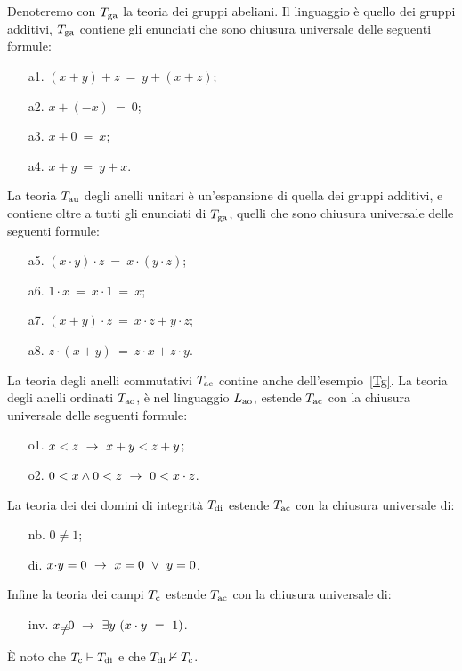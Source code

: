 \begin{example}
Denoteremo con $T_{\rm ga}$ la teoria dei gruppi abeliani. Il linguaggio \`e quello dei gruppi additivi, $T_{\rm ga}$ contiene gli enunciati che sono chiusura universale delle seguenti formule:
\begin{itemize}
\item[a1.] $(x+y) +z\ =\ y+(x+z)$;
\item[a2.] $x+(-x)\ =\ 0$;
\item[a3.] $x+0\ = \ x$;
\item[a4.] $x+y\ =\ y+x$.
\end{itemize}
La teoria $T_{\rm au}$ degli anelli unitari \`e un'espansione di quella dei gruppi additivi, e contiene oltre a tutti gli enunciati di $T_{\rm ga}$, quelli che sono chiusura universale delle seguenti formule:
\begin{itemize}
\item[a5.] $(x\cdot  y)\cdot  z\  =\ x\cdot (y\cdot  z)$;
\item[a6.] $1\cdot  x\ =\ x\cdot  1\ =\ x$;
\item[a7.] $(x+y)\cdot  z\ =\ x\cdot  z + y\cdot  z$;
\item[a8.] $z\cdot  (x+y)\ =\ z\cdot  x + z\cdot  y$.
\end{itemize}
La teoria degli anelli commutativi $T_{\rm ac}$ contine anche  dell'esempio~\ref{Tg}. La teoria degli anelli ordinati $T_{\rm ao}$, \`e nel linguaggio $L_{\rm ao}$, estende $T_{\rm ac}$ con la chiusura universale delle seguenti formule:
\begin{itemize}
\item[o1.] $x<z\ \rightarrow\ x+y<z+y$;
\item[o2.] $0<x \wedge 0<z\ \rightarrow\ 0<x\cdot z$.
\end{itemize}
La teoria dei dei domini di integrit\`a $T_{\rm di}$ estende $T_{\rm ac}$ con la chiusura universale di:
\begin{itemize}
\item[nb.] $0\neq 1$;
\item[di.] $x\mathord\cdot y =0\ \rightarrow\ x=0\ \vee\ y=0$.
\end{itemize}
Infine la teoria dei campi $T_{\rm c}$ estende $T_{\rm ac}$ con la chiusura universale di: 
\begin{itemize}
\item[inv.] $x\neq0\ \imp\ \E y\ (x\cdot y\ =\ 1)$.
\end{itemize}
\`E noto che $T_{\rm c}\vdash T_{\rm di}$ e che  $T_{\rm di}\nvdash T_{\rm c}$.\QED
\end{example}

